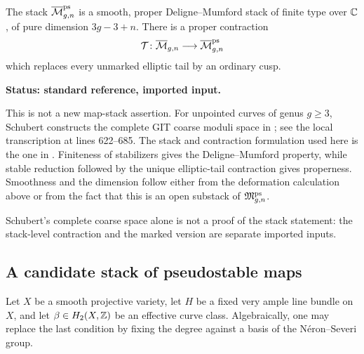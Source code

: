 \documentclass[12pt]{memoir}
\begin{document}
\begin{Th}
    \label{thm-ps-curve-stack}
    The stack \(\overline{\mathcal{M}}^{\operatorname{\mathrm{ps}}}_{g,n}\) is a smooth, proper
    Deligne--Mumford stack of finite type over \(\mathbb{C}\), of pure dimension
    \(3g-3+n\).  There is a proper contraction
    \[
        \mathcal{T}\colon\overline{\mathcal{M}}_{g,n}\longrightarrow\overline{\mathcal{M}}^{\operatorname{\mathrm{ps}}}_{g,n}
    \]
    which replaces every unmarked elliptic tail by an ordinary cusp.

    \noindent\textbf{Status: standard reference, imported input.}
\end{Th}

\begin{ptcbp}
    This is not a new map-stack assertion.  For unpointed curves of genus
    \(g\geq3\), Schubert constructs the complete GIT coarse moduli space in
    \cite[Section~5]{SchubertPSModSps}; see the local transcription at lines
    622--685.  The stack and contraction formulation used here is the one in
    \cite[Section~2]{RenzoAndCo}.  Finiteness of stabilizers gives the
    Deligne--Mumford property, while stable reduction followed by the unique
    elliptic-tail contraction gives properness.  Smoothness and the dimension
    follow either from the deformation calculation above or from the fact
    that this is an open substack of \(\mathfrak M^{\operatorname{\mathrm{ps}}}_{g,n}\).

    Schubert's complete coarse space alone is not a proof of the stack
    statement: the stack-level contraction and the marked version are
    separate imported inputs.
\end{ptcbp}

\subsection{A candidate stack of pseudostable maps}

Let \(X\) be a smooth projective variety, let \(H\) be a fixed very ample
line bundle on \(X\), and let \(\beta\in H_2(X,\mathbb{Z})\) be an effective curve
class.  Algebraically, one may replace the last condition by fixing the
degree against a basis of the N\'eron--Severi group.
\end{document}
